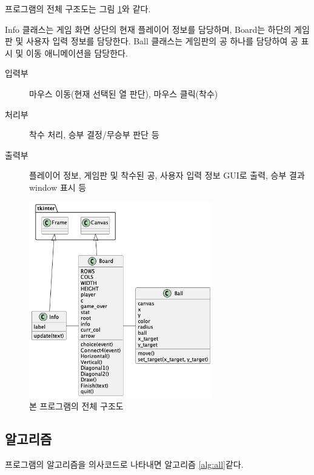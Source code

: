 \documentclass{article}
\begin{document}
프로그램의 전체 구조도는 그림 \ref{fig:structurechart}와 같다. 

Info 클래스는 게임 화면 상단의 현재 플레이어 정보를 담당하며, Board는 하단의 게임판 및 사용자 입력 정보를 담당한다.
Ball 클래스는 게임판의 공 하나를 담당하여 공 표시 및 이동 애니메이션을 담당한다.

\begin{description}
  \item[입력부] 마우스 이동(현재 선택된 열 판단), 마우스 클릭(착수)
  \item[처리부] 착수 처리, 승부 결정/무승부 판단 등
  \item[출력부] 플레이어 정보, 게임판 및 착수된 공, 사용자 입력 정보 GUI로 출력, 승부 결과 window 표시 등
\end{description}

\begin{figure}
  \begin{center}
    \includegraphics[width=8cm]{assets/structure_chart.png}
    \caption{본 프로그램의 전체 구조도}
    \label{fig:structurechart}
  \end{center}
\end{figure}

\subsection{알고리즘}
프로그램의 알고리즘을 의사코드로 나타내면 알고리즘 \ref{alg:all}\과 같다.
\end{document}
